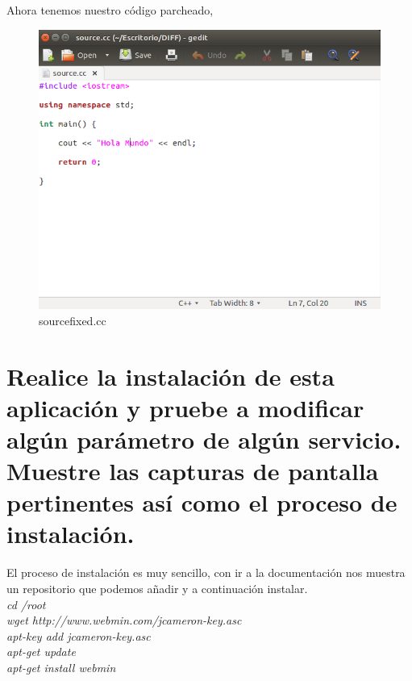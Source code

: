 Ahora tenemos nuestro código parcheado,

	\begin{figure}[H]
	\centering
	\includegraphics[scale=0.35]{pics/sourcefixed.png}
	\caption{sourcefixed.cc} \label{fig:sourcefixed.cc}
	\end{figure}


\section[Cuestión 12]{Realice la instalación de esta aplicación y pruebe a modificar algún parámetro de algún servicio. Muestre las capturas de pantalla	pertinentes así como el proceso de instalación.}

El proceso de instalación es muy sencillo, con ir a la documentación nos muestra un repositorio que podemos añadir y a continuación instalar.\cite{webmin}\\

\textit{cd /root}\\
\textit{wget http://www.webmin.com/jcameron-key.asc}\\
\textit{apt-key add jcameron-key.asc}\\
\textit{apt-get update}\\
\textit{apt-get install webmin}\\

